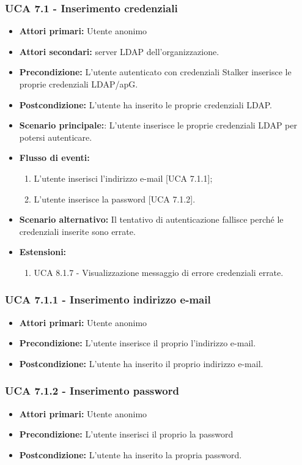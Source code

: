 \subsubsection{UCA 7.1 - Inserimento credenziali}
\begin{itemize}
	\item \textbf{Attori primari:} Utente anonimo 
	\item \textbf{Attori secondari:} server LDAP dell'organizzazione.
	\item \textbf{Precondizione:} L'utente autenticato con credenziali Stalker inserisce le proprie credenziali LDAP/ap{G}.
	\item \textbf{Postcondizione:} L'utente ha inserito le proprie credenziali LDAP.
	\item \textbf{Scenario principale:}: L'utente inserisce le proprie credenziali LDAP per potersi autenticare.
	\item \textbf{Flusso di eventi:}
	\begin{enumerate}
		\item L'utente inserisci l'indirizzo e-mail [UCA 7.1.1];
		\item L'utente inserisce la password [UCA 7.1.2].
	\end{enumerate}
	\item \textbf{Scenario alternativo:} Il tentativo di autenticazione fallisce perché le credenziali inserite sono errate.
	\item \textbf{Estensioni:}
	\begin{enumerate}
		\item UCA 8.1.7 - Visualizzazione messaggio di errore credenziali errate.
	\end{enumerate}
\end{itemize}

\subsubsection{UCA 7.1.1 - Inserimento indirizzo e-mail}%
\begin{itemize}
	\item \textbf{Attori primari:} Utente anonimo
	\item \textbf{Precondizione:} L'utente inserisce il proprio l'indirizzo e-mail.
	\item \textbf{Postcondizione:} L'utente ha inserito il proprio indirizzo e-mail.
\end{itemize}

\subsubsection{UCA 7.1.2 - Inserimento password}%
\begin{itemize}
	\item \textbf{Attori primari:} Utente anonimo
	\item \textbf{Precondizione:} L'utente inserisci il proprio la password
	\item \textbf{Postcondizione:} L'utente ha inserito la propria password.
\end{itemize}

